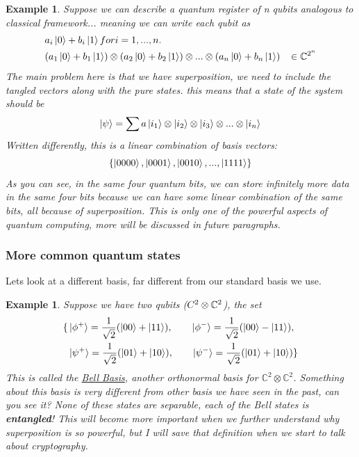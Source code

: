 \documentclass[12pt]{article}
\theoremstyle{plain}
\theoremstyle{nonumberplain}
\theoremstyle{plain}
\newtheorem{example}[lemma]{Example}
\theoremstyle{nonumberplain}
\newcommand\1{{\bf 1}}
\newcommand{\C}{\mathbb{C}} %
\newcommand{\<}{\left\langle}
\renewcommand{\>}{\right\rangle}
\begin{document}
\begin{example}
Suppose we can describe a quantum register of n qubits analogous to classical framework... meaning we can write each qubit as 
\begin{equation}
\begin{split}
&a_i\ket{0} + b_i\ket{1} for i = 1, ..., n.  \\
&(a_1\ket{0}+b_1\ket{1}) \otimes (a_2\ket{0}+b_2\ket{1}) \otimes ... \otimes (a_n\ket{0}+b_n\ket{1}) \;\;\; \in \C^{2^n}
\end{split} 
\end{equation}
The main problem here is that we have superposition, we need to include the tangled vectors along with the pure states. this means that a state of the system should be
\begin{equation}
\ket{\psi} = \sum a\ket{i_1} \otimes \ket{i_2} \otimes \ket{i_3} \otimes ... \otimes \ket{i_n}
\end{equation}
Written differently, this is a linear combination of basis vectors:
\begin{equation}
\{\ket{0000}, \ket{0001}, \ket{0010}, ... , \ket{1111}\}
\end{equation}
As you can see, in the same four quantum bits, we can store infinitely more data in the same four bits because we can have some linear combination of the same bits, all because of superposition.  This is only one of the powerful aspects of quantum computing, more will be discussed in future paragraphs.
\end{example}

\subsubsection{More common quantum states}
Lets look at a different basis, far different from our standard basis we use.
\begin{example}
Suppose we have two qubits ($\\C^2 \otimes \C^2$), the set 
\begin{equation}
\begin{split}
\{&\ket{\phi^+} = \frac{1}{\sqrt{2}} (\ket{00}+\ket{11}),\qquad\ket{\phi^-} = \frac{1}{\sqrt{2}} (\ket{00}-\ket{11}),\\
&\ket{\psi^+} = \frac{1}{\sqrt{2}} (\ket{01}+\ket{10}),\qquad\ket{\psi^-} = \frac{1}{\sqrt{2}} (\ket{01}+\ket{10})\}
\end{split}
\end{equation}
This is called the \underline{Bell Basis}, another orthonormal basis for $\C^2 \otimes \C^2$.  Something about this basis is very different from other basis we have seen in the past, can you see it?  None of these states are separable, \textit{each of the Bell states is \textbf{entangled}!}
This will become more important when we further understand why superposition is so powerful, but I will save that definition when we start to talk about cryptography. 
\end{example}
\end{document}
